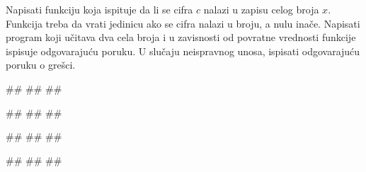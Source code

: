 \begin{Exercise}[label=FUN_11] 
Napisati funkciju  koja ispituje da li
se cifra $c$ nalazi u zapisu celog broja $x$. Funkcija treba da vrati
jedinicu ako se cifra nalazi u broju, a nulu inače. Napisati program koji
učitava dva cela broja i u zavisnosti od povratne vrednosti funkcije
ispisuje odgovarajuću poruku. 
U slučaju neispravnog unosa, ispisati odgovarajuću poruku o grešci.

\begin{miditest}
\begin{upotreba}{1}
#\naslovInt#
##
##
\end{upotreba}
\end{miditest}
\begin{miditest}
\begin{upotreba}{2}
#\naslovInt#
##
##
\end{upotreba}
\end{miditest}

\begin{miditest}
\begin{upotreba}{3}
#\naslovInt#
##
##
\end{upotreba}
\end{miditest}
\begin{miditest}
\begin{upotreba}{4}
#\naslovInt#
##
##
\end{upotreba}
\end{miditest}

\end{Exercise}
\ifresenja 
\begin{Answer}[ref=FUN_11]
\end{Answer} 
\fi


